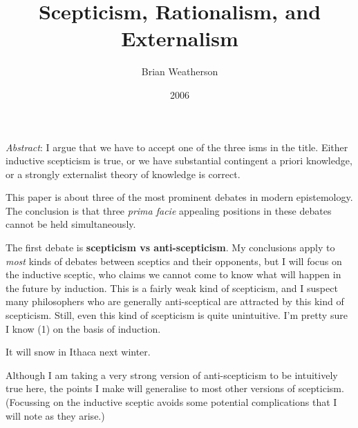 \documentclass[
  11pt,
  letterpaper,
  DIV=11,
  numbers=noendperiod,
  twoside]{scrartcl}
\title{Scepticism, Rationalism, and Externalism}
\author{Brian Weatherson}
\date{2006}
\providecommand{\tightlist}{%
  \setlength{\itemsep}{0pt}\setlength{\parskip}{0pt}}
\renewenvironment{abstract}
 {\vspace{-1.25cm}
 \quotation\small\noindent\emph{Abstract}:}
 {\endquotation}
\begin{document}
\maketitle
\begin{abstract}
I argue that we have to accept one of the three isms in the title.
Either inductive scepticism is true, or we have substantial contingent a
priori knowledge, or a strongly externalist theory of knowledge is
correct.
\end{abstract}


This paper is about three of the most prominent debates in modern
epistemology. The conclusion is that three \emph{prima facie} appealing
positions in these debates cannot be held simultaneously.

The first debate is \textbf{scepticism vs anti-scepticism}. My
conclusions apply to \emph{most} kinds of debates between sceptics and
their opponents, but I will focus on the inductive sceptic, who claims
we cannot come to know what will happen in the future by induction. This
is a fairly weak kind of scepticism, and I suspect many philosophers who
are generally anti-sceptical are attracted by this kind of scepticism.
Still, even this kind of scepticism is quite unintuitive. I'm pretty
sure I know (1) on the basis of induction.

\begin{description}
\tightlist
\item[(1)]
It will snow in Ithaca next winter.
\end{description}

Although I am taking a very strong version of anti-scepticism to be
intuitively true here, the points I make will generalise to most other
versions of scepticism. (Focussing on the inductive sceptic avoids some
potential complications that I will note as they arise.)
\end{document}
